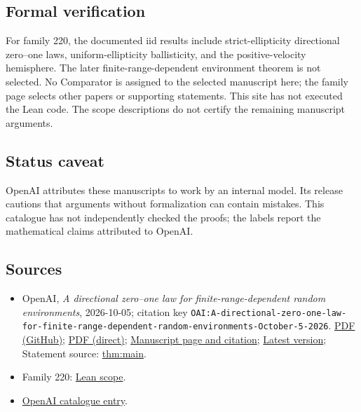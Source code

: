 \documentclass[11pt]{article}
\begin{document}
\subsection{Formal verification}
For family 220, the documented iid results include strict-ellipticity directional zero--one laws, uniform-ellipticity ballisticity, and the positive-velocity hemisphere. The later finite-range-dependent environment theorem is not selected. No Comparator is assigned to the selected manuscript here; the family page selects other papers or supporting statements. This site has not executed the Lean code. The scope descriptions do not certify the remaining manuscript arguments.

\subsection{Status caveat}
OpenAI attributes these manuscripts to work by an internal model. Its release cautions that arguments without formalization can contain mistakes. This catalogue has not independently checked the proofs; the labels report the mathematical claims attributed to OpenAI.

\subsection{Sources}
\begin{itemize}
\item OpenAI, \emph{A directional zero–one law for finite-range-dependent random environments}, 2026-10-05; citation key \texttt{OAI:A-directional-zero-one-law-for-finite-range-dependent-random-environments-October-5-2026}. \href{https://github.com/openai/math/blob/adc7f1241b42e322a6451854ab7e4b4c146bf78a/preprints/A-directional-zero-one-law-for-finite-range-dependent-random-environments-October-5-2026/directional-zero-one-finite-range.pdf}{PDF (GitHub)}; \href{https://github.com/openai/math/raw/adc7f1241b42e322a6451854ab7e4b4c146bf78a/preprints/A-directional-zero-one-law-for-finite-range-dependent-random-environments-October-5-2026/directional-zero-one-finite-range.pdf}{PDF (direct)}; \href{https://github.com/openai/math/blob/adc7f1241b42e322a6451854ab7e4b4c146bf78a/preprints/A-directional-zero-one-law-for-finite-range-dependent-random-environments-October-5-2026/README.md}{Manuscript page and citation}; \href{https://github.com/openai/math/blob/main/preprints/A-directional-zero-one-law-for-finite-range-dependent-random-environments-October-5-2026/directional-zero-one-finite-range.pdf}{Latest version}; Statement source: \href{https://github.com/openai/math/blob/adc7f1241b42e322a6451854ab7e4b4c146bf78a/preprints/A-directional-zero-one-law-for-finite-range-dependent-random-environments-October-5-2026/build/manuscript/main.tex\#L106}{thm:main}.
\item Family 220: \href{https://github.com/openai/math/blob/adc7f1241b42e322a6451854ab7e4b4c146bf78a/lean/docs/220.md}{Lean scope}.
\item \href{https://github.com/openai/math/blob/adc7f1241b42e322a6451854ab7e4b4c146bf78a/CONTENTS.md}{OpenAI catalogue entry}.
\end{itemize}
\end{document}
